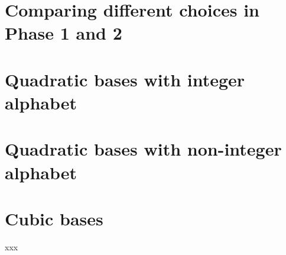 
%		
\section{Comparing different choices in Phase 1 and 2}

\section{Quadratic bases with integer alphabet}

\section{Quadratic bases with non-integer alphabet}

\section{Cubic bases}

\begin{table}[h]
	\begin{center}
	
	\end{center}
\caption{xxx}
\label{tab:results}
\end{table}
